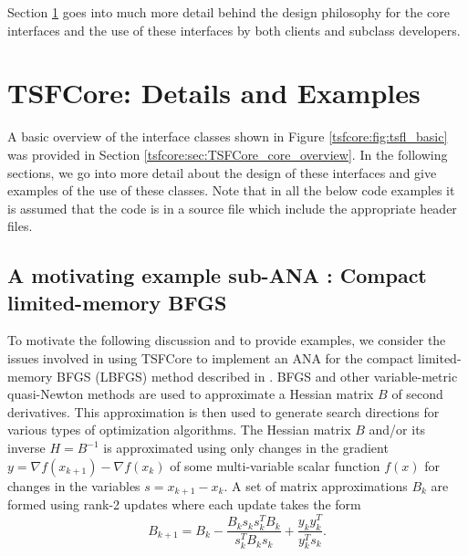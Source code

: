 Section \ref{tsfcore:sec:TSFCore_Details} goes into much more detail behind
the design philosophy for the core interfaces and the use of these
interfaces by both clients and subclass developers.

%
\section{TSFCore: Details and Examples}
\label{tsfcore:sec:TSFCore_Details}
%

A basic overview of the interface classes shown in Figure
\ref{tsfcore:fig:tsfl_basic} was provided in Section
\ref{tsfcore:sec:TSFCore_core_overview}.  In the following sections, we go into
more detail about the design of these interfaces and give examples of
the use of these classes.  Note that in all the below code examples it
is assumed that the code is in a source file which include the
appropriate header files.

%
\subsection{A motivating example sub-ANA : Compact limited-memory BFGS}
\label{tsfcore:sec:LBFGS}
%

To motivate the following discussion and to provide examples, we
consider the issues involved in using TSFCore to implement an ANA for the
compact limited-memory BFGS (LBFGS) method described in
\cite{ref:byrd_et_all_lbfgs_1994}.  BFGS and other variable-metric
quasi-Newton methods are used to approximate a Hessian matrix $B$ of
second derivatives.  This approximation is then used to generate
search directions for various types of optimization algorithms.  The
Hessian matrix $B$ and/or its inverse $H = B^{-1}$ is approximated
using only changes in the gradient $y = \nabla f(x_{k+1}) - \nabla
f(x_k)$ of some multi-variable scalar function $f(x)$ for changes
in the variables $s = x_{k+1} - x_k$.  A set of matrix
approximations $B_k$ are formed using rank-2 updates where each update
takes the form
%
\begin{equation}
B_{k+1} = B_k - \frac{B_k s_k s_k^T B_k}{s_k^T B_k s_k} + \frac{y_k y_k^T}{y_k^T s_k}.
\end{equation}

